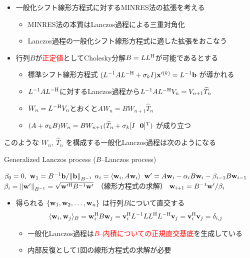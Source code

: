 
\begin{itemize}
	\item 一般化シフト線形方程式に対するMINRES法の拡張を考える
		\begin{itemize}
			\item MINRES法の本質はLanczos過程による三重対角化
			\item Lanczos過程の一般化シフト線形方程式に適した拡張をおこなう
		\end{itemize}
	\item 行列$B$が\textcolor{red}{正定値}としてCholesky分解$B=LL^{\mathrm{H}}$が可能であるとする
		\begin{itemize}
			\item 標準シフト線形方程式 $(L^{-1}AL^{-\mathrm{H}} + \sigma_{k}I)\vb{x}'^{(k)} = L^{-1}\vb{b}$ が導かれる
			\item $L^{-1}AL^{-\mathrm{H}}$に対するLanczos過程から$L^{-1}AL^{-\mathrm{H}}V_{n} = V_{n+1}\widehat{T}_{n}$
			\item $W_{n} = L^{-\mathrm{H}}V_{n}$とおくと$AW_{n}=BW_{n+1}\widehat{T}_{n}$
			\item $(A+\sigma_{k}B)W_{n}=BW_{n+1}(\widehat{T}_{n} + \sigma_{k}[I \ \  \vb{0}]^{\mathrm{T}})$ が成り立つ
		\end{itemize}
\end{itemize}
\vspace{4.7pt}
このような $W_{n},\ \widehat{T}_{n}$ を構成する一般化Lanczos過程は次のようになる
\begin{algorithm}[H]
   \caption{ Generalized Lanczos process ($B$--Lanczos process)}
   \label{alg-ex-lanczos}
   \begin{algorithmic}[1]
   	\vspace{-0.4\baselineskip}
   	\State $\beta_0 = 0,\ \vb{w}_1 = B^{-1}\vb{b} / \norm{\vb{b}}_{B^{-1}}$
   		\State $\alpha_i = \langle \vb{w}_i, A\vb{w}_i \rangle$
   		\State $\vb{w}' = A\vb{w}_i - \alpha_i B\vb{w}_i - \beta_{i-1} B \vb{w}_{i-1}$
   		\State $\beta_i = \norm{\vb{w}'}_{B^{-1}} = \sqrt{\vb{w}'^{\mathrm{H}} B^{-1} \vb{w}'}$ （線形方程式の求解）
   		\State $\vb{w}_{i+1} = B^{-1}\vb{w}' / \beta_i$
   	\EndFor
   \end{algorithmic}
\end{algorithm}
\vspace{-10pt}
\begin{itemize}
	\item 得られる $\{ \vb{w}_{1}, \vb{w}_{2}, \dots, \vb{w}_{n} \}$ は行列$B$について直交する
	\begin{align}
		\langle \vb{w}_{i}, \vb{w}_{j} \rangle_{B} = \vb{w}_{i}^{\mathrm{H}} B \vb{w}_{j} = \vb{v}_{i}^{\mathrm{H}} L^{-1} LL^{\mathrm{H}} L^{-\mathrm{H}} \vb{v}_{j} = \vb{v}_{i}^{\mathrm{H}} \vb{v}_{j} = \delta_{i,j}
	\end{align}
	\vspace{-0.9\baselineskip}
	\begin{itemize}
		\item 一般化Lanczos過程は\textcolor{red}{$B$--内積についての正規直交基底}を生成している
		\item 内部反復として1回の線形方程式の求解が必要
	\end{itemize}
\end{itemize}



